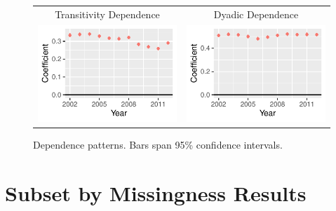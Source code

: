 \documentclass[reqno,onecolumn,letterpaper,12pt]{article}
\begin{document}
\begin{figure}[!h]
\centering
\begin{tabular}{@{\hskip -.05cm}c@{\hskip .2cm}c}
Transitivity Dependence  & Dyadic Dependence\\
\includegraphics[height=.165\textheight, clip=true, trim=.55cm .6cm 0cm .1cm]{SI_figures/amen_rl_plots/trans.dep.pdf}   &
\includegraphics[height=.165\textheight, clip=true, trim=.55cm .6cm 0cm .1cm]{SI_figures/amen_rl_plots/dyad.dep.pdf} \\
\end{tabular}
\caption{\label{fig:AMEnetterms} Dependence patterns. Bars span 95\% confidence intervals. }
\end{figure}

\section{Subset by Missingness Results}\label{qlevelresults}
\end{document}
